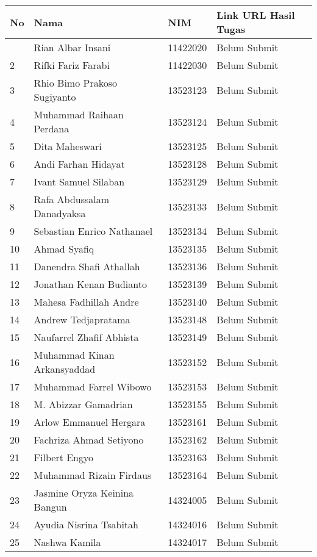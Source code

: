 \documentclass[
  letterpaper,
  DIV=11,
  numbers=noendperiod]{scrreprt}
\begin{document}
\begin{longtable}[]{@{}llll@{}}
\toprule\noalign{}
No & Nama & NIM & Link URL Hasil Tugas \\
\midrule\noalign{}
\endhead
\bottomrule\noalign{}
\endlastfoot
1 & Rian Albar Insani & 11422020 & Belum Submit \\
2 & Rifki Fariz Farabi & 11422030 & Belum Submit \\
3 & Rhio Bimo Prakoso Sugiyanto & 13523123 & Belum Submit \\
4 & Muhammad Raihaan Perdana & 13523124 & Belum Submit \\
5 & Dita Maheswari & 13523125 & Belum Submit \\
6 & Andi Farhan Hidayat & 13523128 & Belum Submit \\
7 & Ivant Samuel Silaban & 13523129 & Belum Submit \\
8 & Rafa Abdussalam Danadyaksa & 13523133 & Belum Submit \\
9 & Sebastian Enrico Nathanael & 13523134 & Belum Submit \\
10 & Ahmad Syafiq & 13523135 & Belum Submit \\
11 & Danendra Shafi Athallah & 13523136 & Belum Submit \\
12 & Jonathan Kenan Budianto & 13523139 & Belum Submit \\
13 & Mahesa Fadhillah Andre & 13523140 & Belum Submit \\
14 & Andrew Tedjapratama & 13523148 & Belum Submit \\
15 & Naufarrel Zhafif Abhista & 13523149 & Belum Submit \\
16 & Muhammad Kinan Arkansyaddad & 13523152 & Belum Submit \\
17 & Muhammad Farrel Wibowo & 13523153 & Belum Submit \\
18 & M. Abizzar Gamadrian & 13523155 & Belum Submit \\
19 & Arlow Emmanuel Hergara & 13523161 & Belum Submit \\
20 & Fachriza Ahmad Setiyono & 13523162 & Belum Submit \\
21 & Filbert Engyo & 13523163 & Belum Submit \\
22 & Muhammad Rizain Firdaus & 13523164 & Belum Submit \\
23 & Jasmine Oryza Keinina Bangun & 14324005 & Belum Submit \\
24 & Ayudia Nisrina Tsabitah & 14324016 & Belum Submit \\
25 & Nashwa Kamila & 14324017 & Belum Submit \\

\end{longtable}
\end{document}
